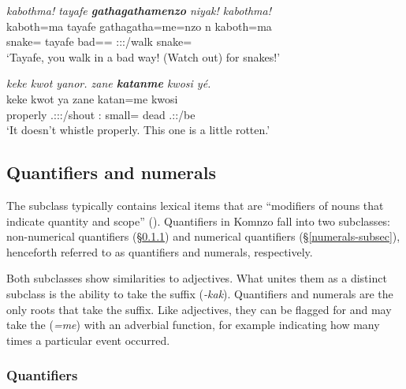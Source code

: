 \begin{exe}
	\ex \emph{kabothma! tayafe \textbf{gathagathamenzo} niyak! kabothma!}\\
	\gll kaboth=ma tayafe {gathagatha=me=nzo} n kaboth=ma\\
	snake={\Char} tayafe bad=\Ins={\Only} \Ssg:\Sbj:\Nonpast:\Ipfv/walk snake={\Char}\\
	\trans `Tayafe, you walk in a bad way! (Watch out) for snakes!'
	\label{ex050}
\end{exe}
\begin{exe}
	\ex \emph{keke kwot yanor. zane \textbf{katanme} kwosi yé.}\\
	\gll keke kwot ya zane katan=me kwosi \\
	{\Neg} properly \Tsg.\Masc:\Sbj:\Nonpast:\Ipfv/shout \Dem:{\Prox} small={\Ins} dead \Tsg.\Masc:\Nonpast:\Ipfv/be\\
	\trans `It doesn't whistle properly. This one is a little rotten.'
	\label{ex043}
\end{exe}

\subsection{Quantifiers and numerals} \label{quantifiers-numerals-sec}

The  subclass typically contains lexical items that are ``modifiers of nouns that indicate quantity and scope'' (\citealt[37]{Schachter:2007vv}). Quantifiers in Komnzo fall into two subclasses: non-numerical quantifiers ({\S}\ref{quantifiers-subsec}) and numerical quantifiers ({\S}\ref{numerals-subsec}), henceforth referred to as quantifiers and numerals, respectively.

Both subclasses show similarities to adjectives. What unites them as a distinct subclass is the ability to take the  suffix (\emph{-kak}). Quantifiers and numerals are the only roots that take the  suffix. Like adjectives, they can be flagged for  and may take the   (\emph{=me}) with an adverbial function, for example indicating how many times a particular event occurred.

\subsubsection{Quantifiers} \label{quantifiers-subsec}


